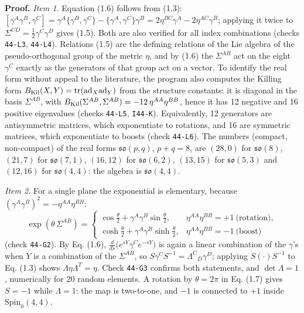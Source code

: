 \documentclass[
  10pt,
]{article}
\begin{document}
\textbf{Proof.} \emph{Item 1.} Equation (1.6) follows from (1.3):
\([\gamma^A\gamma^B,\gamma^C]=\gamma^A\{\gamma^B,\gamma^C\}-\{\gamma^A,\gamma^C\}\gamma^B=2\eta^{BC}\gamma^A-2\eta^{AC}\gamma^B\);
applying it twice to \(\Sigma^{CD}=\tfrac12\gamma^C\gamma^D\) gives
(1.5). Both are also verified for all index combinations (checks
\texttt{44-L3}, \texttt{44-L4}). Relations (1.5) are the defining
relations of the Lie algebra of the pseudo-orthogonal group of the
metric \(\eta\), and by (1.6) the \(\Sigma^{AB}\) act on the eight
\(\gamma^C\) exactly as the generators of that group act on a vector. To
identify the real form without appeal to the literature, the program
also computes the Killing form
\(B_{\rm Kil}(X,Y)=\mathrm{tr}(\mathrm{ad}_X\mathrm{ad}_Y)\) from the
structure constants: it is diagonal in the basis \(\Sigma^{AB}\), with
\(B_{\rm Kil}(\Sigma^{AB},\Sigma^{AB})=-12\,\eta^{AA}\eta^{BB}\), hence
it has 12 negative and 16 positive eigenvalues (checks \texttt{44-L5},
\texttt{I44-K}). Equivalently, 12 generators are antisymmetric matrices,
which exponentiate to rotations, and 16 are symmetric matrices, which
exponentiate to boosts (check \texttt{44-L6}). The numbers (compact,
non-compact) of the real forms \(\mathfrak{so}(p,q)\), \(p+q=8\), are
\((28,0)\) for \(\mathfrak{so}(8)\), \((21,7)\) for
\(\mathfrak{so}(7,1)\), \((16,12)\) for \(\mathfrak{so}(6,2)\),
\((13,15)\) for \(\mathfrak{so}(5,3)\) and \((12,16)\) for
\(\mathfrak{so}(4,4)\): the algebra is \(\mathfrak{so}(4,4)\).

\emph{Item 2.} For a single plane the exponential is elementary, because
\((\gamma^A\gamma^B)^2=-\eta^{AA}\eta^{BB}\):
\[\exp(\theta\,\Sigma^{AB})=\begin{cases}\cos\frac\theta2+\gamma^A\gamma^B\sin\frac\theta2,&\eta^{AA}\eta^{BB}=+1\ \text{(rotation)},\\[2pt]
\cosh\frac\theta2+\gamma^A\gamma^B\sinh\frac\theta2,&\eta^{AA}\eta^{BB}=-1\ \text{(boost)}\end{cases}\tag{1.7}\]
(check \texttt{44-G2}). By Eq. (1.6),
\(\frac{d}{ds}\big(e^{sY}\gamma^Ce^{-sY}\big)\) is again a linear
combination of the \(\gamma\)'s when \(Y\) is a combination of the
\(\Sigma^{AB}\), so \(S\gamma^CS^{-1}=\Lambda^C{}_D\gamma^D\); applying
\(S(\cdot)S^{-1}\) to Eq. (1.3) shows \(\Lambda\eta\Lambda^T=\eta\).
Check \texttt{44-G3} confirms both statements, and \(\det\Lambda=1\),
numerically for 20 random elements. A rotation by \(\theta=2\pi\) in Eq.
(1.7) gives \(S=-1\) while \(\Lambda=1\): the map is two-to-one, and
\(-1\) is connected to \(+1\) inside \(\mathrm{Spin}_0(4,4)\).
\end{document}
